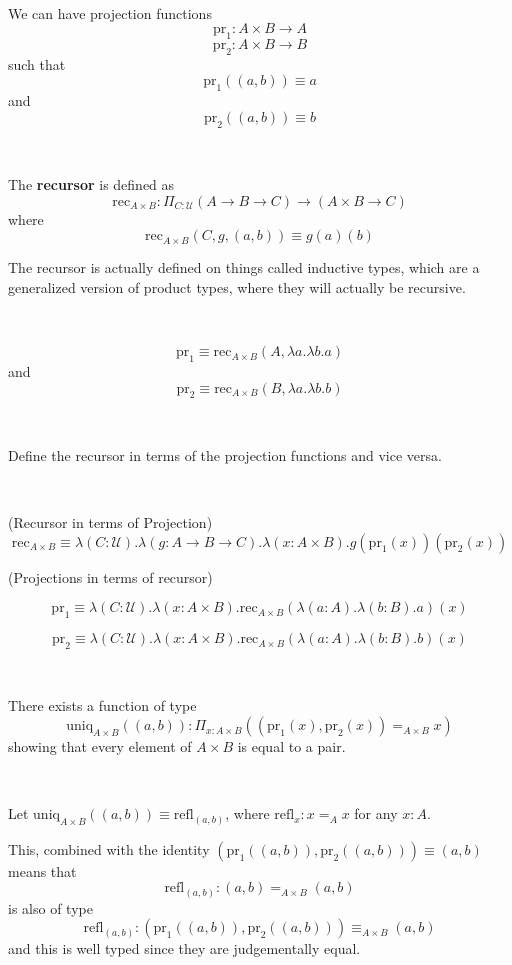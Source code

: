 \documentclass{article}
\begin{document}
\begin{example}
\

We can have projection functions $$\text{pr}_1: A \times B \to A$$$$\text{pr}_2: A \times B \to B$$such that $$\text{pr}_1((a,b)) \equiv a$$and $$\text{pr}_2((a,b)) \equiv b$$
\end{example}

\begin{definition}[Recursor]
\

The \textbf{recursor} is defined as $$\text{rec}_{A \times B}: \Pi_{C : \mathcal{U}} (A \to B \to C) \to (A\times B \to C)$$where $$\text{rec}_{A \times B}(C,g,(a,b)) \equiv g(a)(b)$$ 

The recursor is actually defined on things called inductive types, which are a generalized version of product types, where they will actually be recursive.
\end{definition}

\begin{example}
\

$$\text{pr}_1 \equiv \text{rec}_{A \times B}(A, \lambda a. \lambda b.a)$$and$$\text{pr}_2 \equiv \text{rec}_{A \times B}(B, \lambda a. \lambda b.b)$$
\end{example}

\begin{exercise}
\

Define the recursor in terms of the projection functions and vice versa.
\end{exercise}

\begin{solution}
\

(Recursor in terms of Projection) $$\text{rec}_{A \times B} \equiv \lambda(C: \mathcal{U}).\lambda(g: A \to B \to C).\lambda(x: A \times B).g(\text{pr}_1(x))(\text{pr}_2(x))$$

(Projections in terms of recursor) 

$$\text{pr}_1 \equiv \lambda(C: \mathcal{U}).\lambda(x: A \times B).\text{rec}_{A \times B}(\lambda(a: A).\lambda(b:B).a)(x)$$

$$\text{pr}_2 \equiv \lambda(C: \mathcal{U}).\lambda(x: A \times B).\text{rec}_{A \times B}(\lambda(a: A).\lambda(b:B).b)(x)$$
\end{solution}

\begin{proposition}
\

There exists a function of type $$\text{uniq}_{A \times B}((a, b)) : \Pi_{x: A \times B} ((\text{pr}_1(x), \text{pr}_2(x)) =_{A\times B} x)$$showing that every element of $A \times B$ is equal to a pair.
\end{proposition}

\begin{customproof}
\

Let $\text{uniq}_{A\times B}((a,b)) \equiv \text{refl}_{(a,b)}$, where $\text{refl}_{x}: x =_A x$ for any $x:A$. 

This, combined with the identity $(\text{pr}_1((a,b)), \text{pr}_2((a,b))) \equiv (a,b)$ means that $$\text{refl}_{(a,b)}: (a,b) =_{A\times B} (a,b)$$is also of type $$\text{refl}_{(a,b)} : (\text{pr}_1((a,b)), \text{pr}_2((a,b))) \equiv_{A \times B} (a,b)$$and this is well typed since they are judgementally equal.
\end{customproof}
\end{document}
